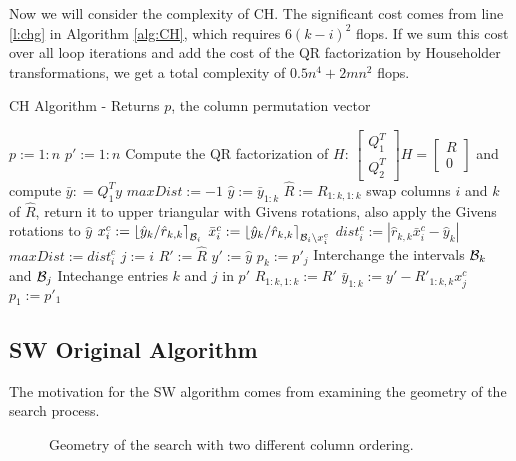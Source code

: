 \documentclass[12pt,Bold,letterpaper]{mcgilletdclass}
\newcommand{\bsmx}{\left[\begin{smallmatrix}}
\newcommand{\esmx}{\end{smallmatrix}\right]}
\begin{document}
Now we will consider the complexity of CH. The 
significant cost comes from line \ref{l:chg} in Algorithm \ref{alg:CH},
which requires $6(k-i)^2$ flops.
If we sum this cost over all loop iterations and add the cost of the QR factorization by Householder transformations, 
we  get a total complexity of $0.5n^4+2mn^2$ flops.

\begin{algorithm}
\caption{CH Algorithm - Returns $p$, the column permutation vector}
\label{alg:CH}
\begin{algorithmic}[1]
\STATE $p := 1:n$
\STATE $p' := 1:n$
\STATE Compute the QR factorization of $H$: $\bsmx Q_1^T \\ Q_2^T \esmx H= \bsmx R\\ 0 \esmx$
             and compute  $\bar{y} : = Q_1^Ty$
  	\STATE $maxDist := -1$
    	\STATE $\hat{y} := \bar{y}_{1:k}$
    	\STATE $\hat{R} := R_{1:k,1:k}$
        \STATE  \label{l:chg} swap columns $i$ and $k$ of $\hat{R}$, return it  to upper
triangular with Givens rotations, also apply the Givens rotations to $\hat{y}$ %
        \STATE $x_i^c := \left \lfloor\hat{y}_k/\hat{r}_{k,k}\right
\rceil_{{\cal B}_i}$
        \STATE $\bar{x}_i^c := \left \lfloor\hat{y}_k/\hat{r}_{k,k}\right
\rceil_{{\cal B}_i\backslash x_i^c}$
        \STATE $dist_i^c := \left | \hat{r}_{k,k}\bar{x}_i^c - \hat{y}_k
\right | $
        	\STATE $maxDist := dist_i^c$
        	\STATE $j := i$
        	\STATE $R' := \hat{R}$
        	\STATE $y' := \hat{y}$
        \ENDIF
    \ENDFOR
    \STATE $p_k := p'_j$
    \STATE Interchange the intervals ${{\cal B}_k}$ and ${{\cal B}_{j}}$
    \STATE Intechange entries $k$ and $j$ in $p'$
    \STATE $R_{1:k,1:k} := R'$
    \STATE $\bar{y}_{1:k} := y' - R'_{1:k,k}x_j^c$
  \ENDFOR
  \STATE $p_1 := p'_1$
\end{algorithmic}
\end{algorithm}

\subsection{SW Original Algorithm}
The motivation for the SW algorithm comes from examining the geometry of the search process.

\ifx\du\undefined
  \newlength{\du}
\fi
\begin{figure}
\caption{Geometry of the search  with two different column ordering.}
\label{SEGeometry}
\end{figure}
\end{document}
